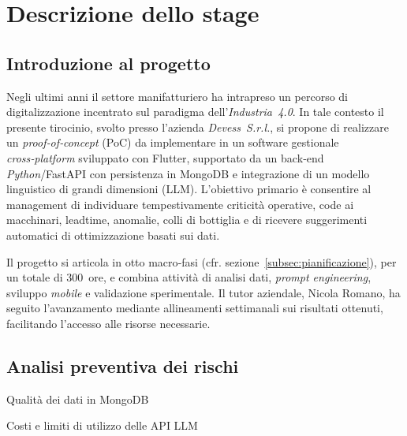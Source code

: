 \chapter{Descrizione dello stage}
\label{chap:descrizione-stage}

\section{Introduzione al progetto}

Negli ultimi anni il settore manifatturiero ha intrapreso un percorso di digitalizzazione incentrato sul paradigma dell’\textit{Industria~4.0}. In tale contesto il presente 
tirocinio, svolto presso l’azienda \textit{Devess~S.r.l.}, si propone di realizzare un \textit{proof‑of‑concept} (\gls{PoC}) da implementare in un software gestionale 
\textit{cross‑platform} sviluppato con Flutter, supportato da un back‑end \textit{Python}/FastAPI con persistenza in MongoDB e integrazione di un modello linguistico di grandi 
dimensioni (\gls{LLM}). L’obiettivo primario è consentire al management di individuare tempestivamente criticità operative, code ai macchinari, \gls{leadtime}, anomalie, colli di 
bottiglia e di ricevere suggerimenti automatici di ottimizzazione basati sui dati.

Il progetto si articola in otto macro‑fasi (cfr. sezione~\ref{subsec:pianificazione}), per un totale di 300~ore, e combina attività di analisi dati, \textit{prompt engineering}, 
sviluppo \textit{mobile} e validazione sperimentale. Il tutor aziendale, Nicola Romano, ha seguito l’avanzamento mediante allineamenti settimanali sui risultati ottenuti, 
facilitando l’accesso alle risorse necessarie.

\section{Analisi preventiva dei rischi}

\begin{risk}{Qualità dei dati in MongoDB}
\end{risk}

\begin{risk}{Costi e limiti di utilizzo delle \gls{API} LLM}
\end{risk}

